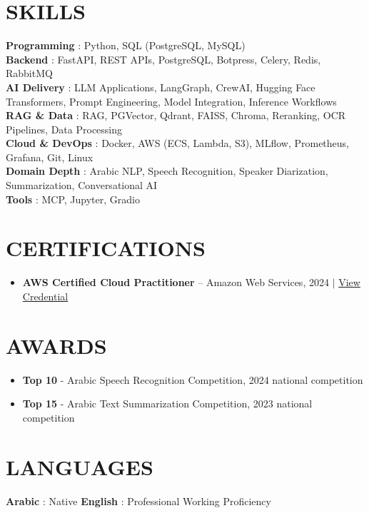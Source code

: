 \documentclass[letterpaper,11pt]{article}
\newcommand{\resumeItem}[1]{
  \item\small{
    {#1 \vspace{-1pt}}
  }
}
\begin{document}
\section{SKILLS}
 \begin{itemize}[leftmargin=0in, label={}]
    \small{\item{
     \textbf{Programming} {: Python, SQL (PostgreSQL, MySQL)}\vspace{2pt} \\
     \textbf{Backend} {: FastAPI, REST APIs, PostgreSQL, Botpress, Celery, Redis, RabbitMQ}\vspace{2pt} \\
     \textbf{AI Delivery} {: LLM Applications, LangGraph, CrewAI, Hugging Face Transformers, Prompt Engineering, Model Integration, Inference Workflows}\vspace{2pt} \\
     \textbf{RAG \& Data} {: RAG, PGVector, Qdrant, FAISS, Chroma, Reranking, OCR Pipelines, Data Processing}\vspace{2pt} \\
     \textbf{Cloud \& DevOps} {: Docker, AWS (ECS, Lambda, S3), MLflow, Prometheus, Grafana, Git, Linux}\vspace{2pt} \\
     \textbf{Domain Depth} {: Arabic NLP, Speech Recognition, Speaker Diarization, Summarization, Conversational AI}\vspace{2pt} \\
     \textbf{Tools} {: MCP, Jupyter, Gradio}
    }}
 \end{itemize}

\section{CERTIFICATIONS}
\begin{itemize}[leftmargin=0.15in]
  \resumeItem{\textbf{AWS Certified Cloud Practitioner} -- Amazon Web Services, 2024 \textnormal{\small $|$ \href{https://www.linkedin.com/posts/ahm215_aws-certified-cloud-practitioner-was-issued-activity-7274436150700769281-TAJd}{View Credential}}}
\end{itemize}

\section{AWARDS}
\begin{itemize}[leftmargin=0.15in]
  \resumeItem{\textbf{Top 10} - Arabic Speech Recognition Competition, 2024 national competition}
  \resumeItem{\textbf{Top 15} - Arabic Text Summarization Competition, 2023 national competition}
\end{itemize}

\section{LANGUAGES}
 \begin{itemize}[leftmargin=0in, label={}]
    \small{\item{
     \textbf{Arabic} {: Native} \hspace{24pt}
     \textbf{English} {: Professional Working Proficiency}
    }}
 \end{itemize}
\end{document}
